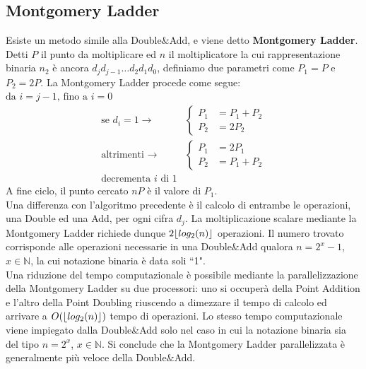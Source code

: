 \documentclass[a4paper,12pt]{tesiinfo}
\DeclarePairedDelimiter\floor{\lfloor}{\rfloor}
\begin{document}
\subsection{Montgomery Ladder}
Esiste un metodo simile alla Double$\&$Add, e viene detto \textbf{Montgomery Ladder}. Detti $P$ il punto da moltiplicare ed $n$ il moltiplicatore la cui rappresentazione binaria $n_2$ \`e ancora $d_{j}d_{j-1}\ldots d_2d_1d_0$, definiamo due parametri come $P_1=P$ e $P_2 = 2P$. La Montgomery Ladder procede come segue: \\
$\text{da }i=j-1 \text{, fino a }i=0$
\begin{align*}
 \text{se } d_i = 1 \to
 &  \begin{cases}
        P_1 &=P_1+P_2\\
        P_2 &=2P_2
    \end{cases}\\
 \text{altrimenti } \to
 &  \begin{cases}
        P_1 &=2P_1\\
        P_2 &=P_1+P_2
    \end{cases}\\
    \text{decrementa $i$ di 1} 
\end{align*}
A fine ciclo, il punto cercato $nP$ \`e il valore di $P_1$.
\\
Una differenza con l'algoritmo precedente \`e il calcolo di entrambe le operazioni, una Double ed una Add, per ogni cifra $d_j$. La moltiplicazione scalare mediante la Montgomery Ladder richiede dunque $2 \floor{log_2(n)}$ operazioni. Il numero trovato corrisponde alle operazioni necessarie in una Double\&Add qualora $n=2^x-1$, $x\in \mathbb{N}$, la cui notazione binaria \`e data soli ``1".
\\
Una riduzione del tempo computazionale \`e possibile mediante la parallelizzazione della Montgomery Ladder su due processori: uno si occuper\`a della Point Addition e l'altro della Point Doubling riuscendo a dimezzare il tempo di calcolo ed arrivare a $O(\floor{log_2(n)})$ tempo di operazioni. Lo stesso tempo computazionale viene impiegato dalla Double\&Add solo nel caso in cui la notazione binaria sia del tipo $n=2^x$, $x\in \mathbb{N}$. Si conclude che la Montgomery Ladder parallelizzata \`e generalmente pi\`u veloce della Double$\&$Add.
%
%
%
%
%
%
%
%
%
%
%
\end{document}
